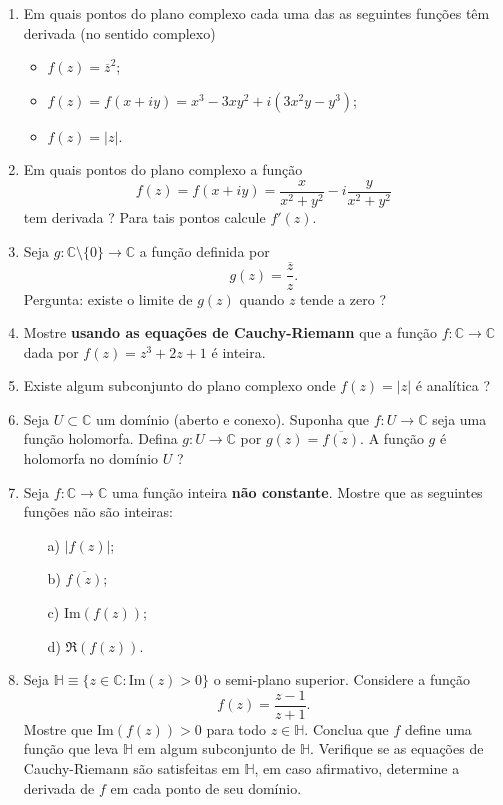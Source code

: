 \begin{enumerate}[leftmargin=*]
	
	
	\item Em quais pontos do plano complexo cada uma das as seguintes funções  
	têm derivada (no sentido complexo)
	
	\begin{itemize}
		\item $f(z)= \overline{z}^2$;
		\item $f(z) = f(x + iy) = x^3-3xy^2+i(3x^2y -y^3)$;
		\item $f(z)= |z|$.
	\end{itemize}
	
	\item Em quais pontos do plano complexo a função 
	$$
	f(z)=f(x+iy) = \frac{x}{x^2+y^2}- i\frac{y}{x^2+y^2}
	$$
	tem derivada ? Para tais pontos calcule $f'(z)$.
	
	
	\item Seja $g:\mathbb{C}\setminus\{0\}\to \mathbb{C}$ a função definida por 
	$$
	g(z)=\frac{\overline{z}}{z}.
	$$
	Pergunta: existe o limite de $g(z)$ quando $z$ tende a zero ?
	
	\item Mostre {\bf usando as equações de Cauchy-Riemann} que a função 
	$f:\mathbb{C}\to\mathbb{C}$ dada por $f(z)=z^3+2z+1$ é inteira.

	\item Existe algum subconjunto do plano complexo onde $f(z)=|z|$ é analítica ?

	\item Seja $U\subset \mathbb{C}$ um domínio (aberto e conexo). Suponha que $f:U\to\mathbb{C}$ seja uma função 
	holomorfa. Defina $g:U\to\mathbb{C}$ por $g(z)=\overline{f(z)}$. A função $g$ é holomorfa no domínio $U$ ?
	
	
	\item Seja $f:\mathbb{C}\to\mathbb{C}$ uma função inteira {\bf não constante}. Mostre que as seguintes funções não 
	são inteiras:
	\begin{itemize}
		\item[a)] $|f(z)|$;
		\item[b)] $\overline{f(z)}$;
		\item[c)] $\text{Im}(f(z))$;
		\item[d)] $\Re(f(z))$.
	\end{itemize}
	
	
	
	\item Seja $\mathbb{H}\equiv\{z\in\mathbb{C}: \text{Im}(z)>0\}$ o semi-plano superior. Considere a função 
	\[ 
		f(z)=\frac{z-1}{z+1}.
	\] 
	Mostre que $\text{Im}(f(z))>0$ para todo $z\in\mathbb{H}$. Conclua que 
	$f$ define uma função que leva $\mathbb{H}$ em algum subconjunto de $\mathbb{H}$. Verifique se as equações 
	de Cauchy-Riemann são satisfeitas em $\mathbb{H}$, em caso afirmativo, determine a derivada de $f$ em cada ponto de
	seu domínio.
	

\end{enumerate}
